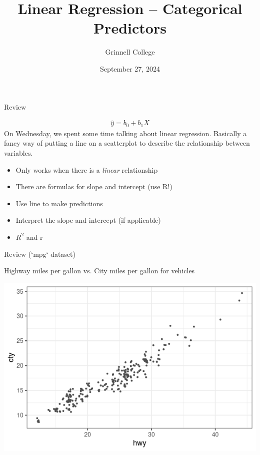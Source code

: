 \documentclass{beamer}
\title[SST-115 / STA-209]{Linear Regression -- Categorical Predictors}
\subtitle{}
\author{Grinnell College}
\date{September 27, 2024}
\begin{document}
\begin{frame}
  \titlepage
\end{frame}

\begin{frame}{Review}

\begin{align*}
\hat{y}= b_0 +  b_1X
\end{align*}
On Wednesday, we spent some time talking about linear regression. Basically a fancy way of putting a line on a scatterplot to describe the relationship between variables.
\vspace{4mm}

\begin{itemize}
\item Only works when there is a \textit{linear} relationship
\item There are formulas for slope and intercept (use R!)
\item Use line to make predictions
\item Interpret the slope and intercept (if applicable)
\item $R^2$ and r
\end{itemize}
\end{frame}




\begin{frame}{Review}
(`mpg` dataset)

Highway miles per gallon vs. City miles per gallon for vehicles 
\begin{center}
\includegraphics[scale=0.5]{reg_reg1.png}
\end{center}
\end{frame}
\end{document}
